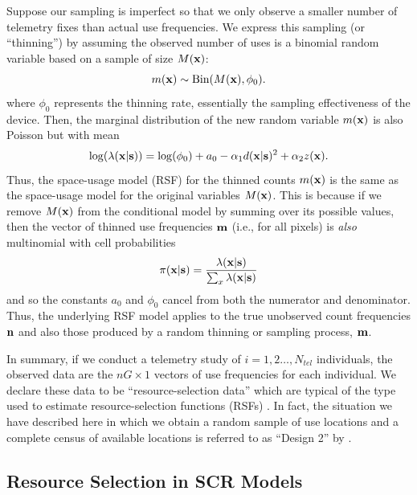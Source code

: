 \documentclass[12pt]{article}
\begin{document}
Suppose our sampling is imperfect so that we only observe a smaller
number of telemetry fixes than actual use
frequencies.
We express this sampling (or ``thinning'') by assuming the observed number of
uses is a binomial random variable based on a sample of size $M({\bf
  x})$:
\[
 m({\bf x}) \sim \mbox{Bin}(M({\bf x}), \phi_{0}).
\]
where $\phi_{0}$
represents the thinning rate, essentially the 
sampling effectiveness of the device.  
 Then, the marginal distribution of the new random variable $m({\bf x})$ is
 also Poisson
but with mean
\[
 \log(\lambda({\bf x}|{\bf s})) = \log(\phi_{0}) + a_{0} -\alpha_{1}
 d({\bf x}|{\bf s})^{2} +  \alpha_{2} z({\bf x}).
\]
 Thus, the space-usage model (RSF) for the
thinned counts $m({\bf x})$ is the same as the space-usage model for the
original variables $M({\bf x})$.  This is because if we remove $M({\bf
x})$
from the conditional
 model by summing over its possible values, then the vector of thinned
 use frequencies
${\bf m}$ (i.e., for all pixels) is {\it also}  multinomial with cell probabilities
\[
\pi({\bf x}|{\bf s}) = \frac{\lambda({\bf x}|{\bf s})}{\sum_{x}  \lambda({\bf x}|{\bf s})}
\]
and so the constants $a_{0}$ and $\phi_{0}$
cancel from both the numerator and
denominator. Thus, the underlying RSF model applies to the true
unobserved count frequencies ${\bf n}$ and also those produced
by a random thinning or sampling process, ${\bf m}$.

In summary, if we conduct a telemetry study of $i=1,2\ldots,N_{tel}$
individuals, the observed data are
the $nG \times 1$  vectors of use frequencies
for each individual.
 We declare these data to be
``resource-selection data'' which are typical of the type used to
estimate resource-selection functions (RSFs) \citep{manly_etal:2002}.
In fact, the situation we have described here in which
we obtain a random sample
of use locations and a complete census of available locations is
referred to as ``Design 2'' by \citep{manly_etal:2002}.



\subsection{Resource Selection in SCR Models}
\end{document}
